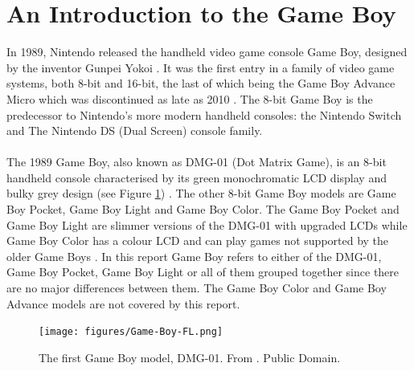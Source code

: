 \section{An Introduction to the Game Boy}
In 1989, Nintendo released the handheld video game console Game Boy, designed by the inventor Gunpei Yokoi \cite{gameboylook} \cite{gameboytimeline1}. It was the first entry in a family of video game systems, both 8-bit and 16-bit, the last of which being the Game Boy Advance Micro which was discontinued as late as 2010 \cite{gameboytimeline1}. The 8-bit Game Boy is the predecessor to Nintendo's more modern handheld consoles: the Nintendo Switch \cite{NintendoSwitch} and The Nintendo DS (Dual Screen) \cite{NintendoDSFamily} console family.\\
\\
The 1989 Game Boy, also known as DMG-01 (Dot Matrix Game), is an 8-bit handheld console characterised by its green monochromatic LCD display and bulky grey design (see Figure \ref{fig:GameBoy-fig}) \cite{gameboylook}. The other 8-bit Game Boy models are Game Boy Pocket, Game Boy Light and Game Boy Color. The Game Boy Pocket and Game Boy Light are slimmer versions of the DMG-01 with upgraded LCDs while Game Boy Color has a colour LCD and can play games not supported by the older Game Boys \cite{gameboytimeline1}. In this report Game Boy refers to either of the DMG-01, Game Boy Pocket, Game Boy Light or all of them grouped together since there are no major differences between them. The Game Boy Color and Game Boy Advance models are not covered by this report.

\begin{figure}[H]
    \centering
    \texttt{[image: figures/Game-Boy-FL.png]}
    \caption{The first Game Boy model, DMG-01. From \cite{gameboy-wikipedia}. Public Domain.}
    \label{fig:GameBoy-fig}
\end{figure}

